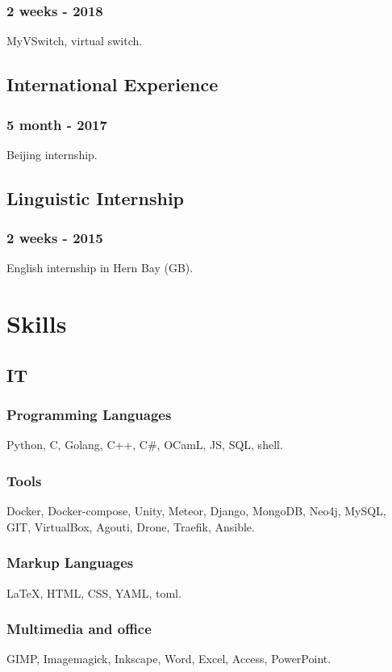 \documentclass{article}
\begin{document}
\begin{multicols}{2}
                \subsubsection{2 weeks - 2018}
                    MyVSwitch, virtual switch.
            \subsection{International Experience}
                \subsubsection{5 month - 2017}
                    Beijing internship.
            \subsection{Linguistic Internship}
                \subsubsection{2 weeks - 2015}
                    English internship in Hern Bay (GB).

        \columnbreak

        \section{Skills}
            \subsection{IT}
                \subsubsection{Programming Languages}
                    Python, C, Golang, C++, C\#, OCamL, JS, SQL, shell.
                \subsubsection{Tools}
                    Docker, Docker-compose, Unity, Meteor, Django, MongoDB, Neo4j, MySQL, GIT, VirtualBox, Agouti, Drone, Traefik, Ansible.
                \subsubsection{Markup Languages}
                    {\LaTeX}, HTML, CSS, YAML, toml.
                \subsubsection{Multimedia and office}
                    GIMP, Imagemagick, Inkscape, Word, Excel, Access, PowerPoint.

\end{multicols}
\end{document}

